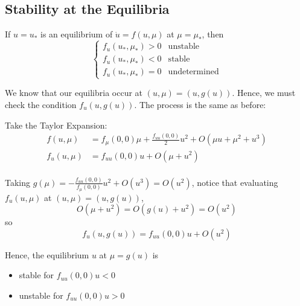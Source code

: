 \documentclass[12pt]{article}
\begin{document}
\subsection{Stability at the Equilibria}
If $u = u_*$ is an equilibrium of $\dot u = f(u, \mu)$ at $\mu = \mu_*$, then
\[\begin{cases}
        f_u(u_*, \mu_*) > 0 & \text{unstable}     \\
        f_u(u_*, \mu_*) < 0 & \text{stable}       \\
        f_u(u_*, \mu_*) = 0 & \text{undetermined}
    \end{cases}\]

We know that our equilibria occur at $(u, \mu) = (u, g(u))$. Hence, we must check the condition $f_u(u, g(u))$. The process is the same as before:

Take the Taylor Expansion:
\begin{align*}
    f(u, \mu)   & = f_{\mu}(0, 0) \mu + \frac{f_{uu}(0, 0)}{2} u^2 + O(\mu u + \mu^2 + u^3) \\
    f_u(u, \mu) & = f_{uu}(0, 0)u + O(\mu + u^2)                                            \\
\end{align*}

Taking $g(\mu) = -\frac{f_{uu}(0, 0)}{f_{\mu}(0, 0)}u^2 + O(u^3) = O(u^2)$, notice that evaluating $f_u(u, \mu)$ at $(u, \mu) = (u, g(u))$,
\[O(\mu + u^2) = O(g(u) + u^2) = O(u^2)\]
so
\[f_u(u, g(u)) = f_{uu}(0,0)u + O(u^2)\]

Hence, the equilibrium $u$ at $\mu = g(u)$ is
\begin{itemize}
    \item stable for $f_{uu}(0, 0) u < 0$
    \item unstable for $f_{uu}(0, 0) u > 0$
\end{itemize}
\end{document}
